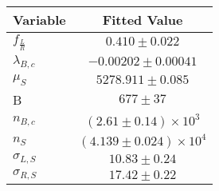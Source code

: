 \begin{tabular}[t]{lc}
\hline
Variable &Fitted Value\\
\hline\hline
$f_{\frac{L}{R}}$&$0.410\pm0.022$\\
\hline
$\lambda_{B,c}$&$-0.00202\pm0.00041$\\
\hline
$\mu_S$&$5278.911\pm0.085$\\
\hline
B&$677\pm37$\\
\hline
$n_{B,c}$&$(2.61\pm0.14)\times 10^3$\\
\hline
$n_S$&$(4.139\pm0.024)\times 10^4$\\
\hline
$\sigma_{L, S}$&$10.83\pm0.24$\\
\hline
$\sigma_{R, S}$&$17.42\pm0.22$\\
\hline
\end{tabular}